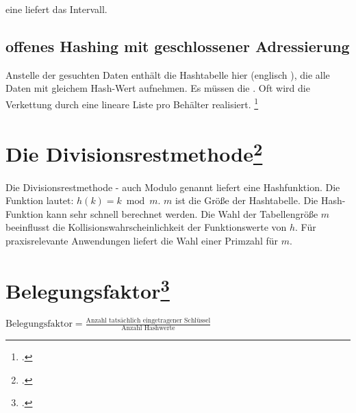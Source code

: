 \documentclass{bschlangaul-haupt}
\begin{document}
eine  liefert das Intervall.

%

\subsection{offenes Hashing mit geschlossener Adressierung}

Anstelle der gesuchten Daten enthält die Hashtabelle hier
 (englisch ), die alle Daten mit gleichem
Hash-Wert aufnehmen. Es müssen die . Oft wird die Verkettung durch eine lineare Liste pro
Behälter realisiert.
\footcite{wiki:hashtabelle}

%

\section{Die Divisionsrestmethode\footcite{wiki:divisionsrestmethode}}

Die Divisionsrestmethode - auch Modulo genannt liefert eine
Hashfunktion. Die Funktion lautet:  $h(k)=k{\bmod {m}}$. $m$ ist die
Größe der Hashtabelle. Die Hash-Funktion kann sehr schnell berechnet
werden. Die Wahl der Tabellengröße $m$ beeinflusst die
Kollisionswahrscheinlichkeit der Funktionswerte von $h$. Für
praxisrelevante Anwendungen liefert die Wahl einer Primzahl für $m$.

\section{Belegungsfaktor\footcite[Seite 29]{aud:fs:tafeluebung-10}}

$\text{Belegungsfaktor} =
\frac{\text{Anzahl tatsächlich eingetragener Schlüssel}}
{\text{Anzahl Hashwerte}}$

\literatur
\end{document}
